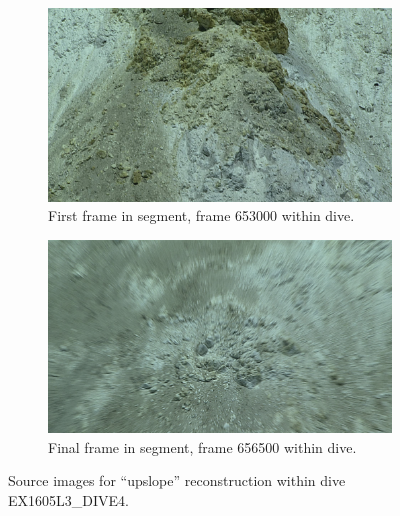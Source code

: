 \documentclass[letterpaper,12pt]{article}
\begin{document}
\begin{figure}
    \centering
    \begin{subfigure}[b]{0.48\textwidth}
        \includegraphics[width=\textwidth]{images/image_653000.png}
        \caption{First frame in segment, frame 653000 within dive.}
        \label{fig:ex1605l3_dive4_upslope_begin}
    \end{subfigure}
    \begin{subfigure}[b]{0.48\textwidth}
        \includegraphics[width=\textwidth]{images/image_656500.png}
        \caption{Final frame in segment, frame 656500 within dive.}
        \label{fig:ex1605l3_dive4_upslope_end}
    \end{subfigure}
    \caption{Source images for ``upslope'' reconstruction within dive EX1605L3\_DIVE4.}
\end{figure}
\end{document}
